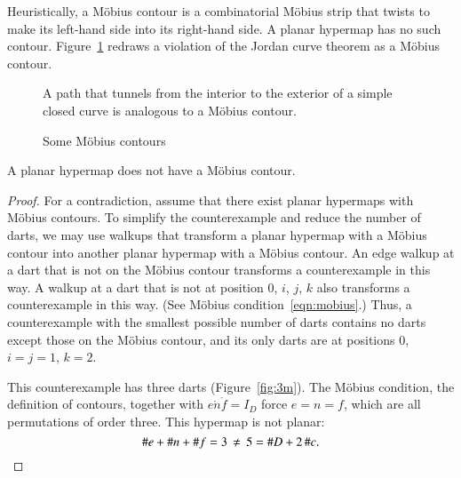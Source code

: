 \begin{remark}
 Heuristically, a M\"obius contour is a 
combinatorial M\"obius strip that
twists to make 
its left-hand side into
its right-hand side.  A planar hypermap has no such contour.  
Figure~\ref{fig:violate-jct}
redraws a violation of the Jordan curve theorem
as a M\"obius contour.   
\end{remark}

\begin{figure}[htb]
\centering
{}
\caption{A path that tunnels from the interior to the exterior
of a simple closed curve
is analogous to a M\"obius contour.}
\label{fig:violate-jct}
\end{figure}

\begin{figure}[htb]
\centering
{}
\caption{Some M\"obius contours}
\label{fig:mobius-contour}
\end{figure}






\begin{lemma}\label{lemma:no-mobius}
A planar hypermap does not have a M\"obius contour.
\end{lemma}
%

\begin{proof} For a contradiction, assume that there exist planar
hypermaps with M\"obius contours.  To simplify the counterexample and
reduce the number of darts,
we may use walkups that transform a planar hypermap
with a M\"obius contour into another planar hypermap with a M\"obius contour.
An edge walkup
at a dart that is not on the M\"obius contour transforms a counterexample
in this way.
A walkup at a dart that is not at position $0$, $i$, $j$, $k$
also transforms a counterexample in this way.  (See M\"obius condition~\ref{eqn:mobius}.)
%
Thus, a counterexample with
the smallest possible number of darts contains no
darts except those on the M\"obius contour, and its only darts
are at positions $0$, $i=j=1$, $k=2$.

This counterexample has three darts (Figure~\ref{fig:3m}).  
The M\"obius condition, the
definition of contours, together with $e\ocirc n\ocirc f=I_D$ force
$e=n=f$, which are all permutations of order three.  This hypermap is not planar:
\[
\# e + \# n + \# f = 3\,\ne\, 5 = \# D + 2\,
\#c.\qedhere
\]
\end{proof}



